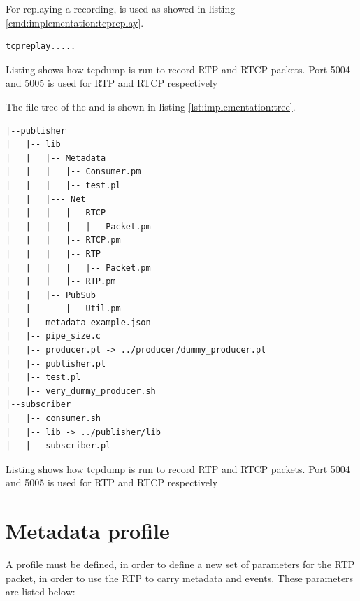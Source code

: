 For replaying a recording,  is used as showed in listing \ref{cmd:implementation:tcpreplay}.
\begin{listing}[h] 
	\begin{verbatim}
tcpreplay.....
	\end{verbatim}
\caption{Listing shows how tcpdump is run to record RTP and RTCP packets. Port 5004 and 5005 is used for RTP and RTCP respectively}
\label{cmd:implementation:tcpreplay}
\end{listing}


The file tree of the \pub{} and \sub{} is shown in listing \ref{lst:implementation:tree}.
\begin{listing}[h] 
	\begin{verbatim}
|--publisher
|   |-- lib
|   |   |-- Metadata
|   |   |   |-- Consumer.pm
|   |   |   |-- test.pl
|   |   |--- Net
|   |   |   |-- RTCP
|   |   |   |   |-- Packet.pm
|   |   |   |-- RTCP.pm
|   |   |   |-- RTP
|   |   |   |   |-- Packet.pm
|   |   |   |-- RTP.pm
|   |   |-- PubSub
|   |       |-- Util.pm
|   |-- metadata_example.json
|   |-- pipe_size.c
|   |-- producer.pl -> ../producer/dummy_producer.pl
|   |-- publisher.pl
|   |-- test.pl
|   |-- very_dummy_producer.sh
|--subscriber
|   |-- consumer.sh
|   |-- lib -> ../publisher/lib
|   |-- subscriber.pl

	\end{verbatim}
\caption{Listing shows how tcpdump is run to record RTP and RTCP packets. Port 5004 and 5005 is used for RTP and RTCP respectively}
\label{cmd:implementation:tcpreplay}
\end{listing}

\section{Metadata profile} \label{sec:implemented:metadataprofile} 
A profile must be defined, in order to define a new set of parameters for the RTP packet, in order to use the RTP to carry metadata and events. These parameters are listed below:

